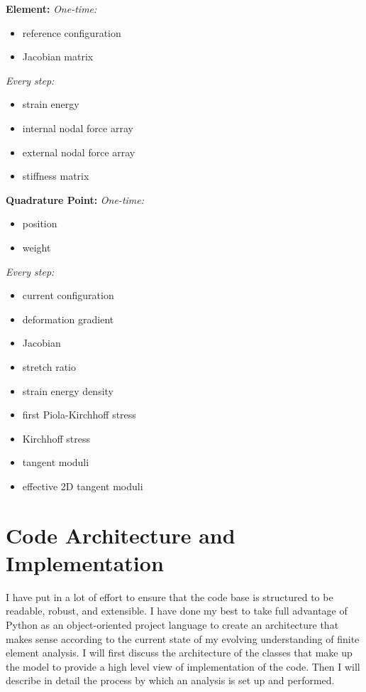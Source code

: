 \documentclass[]{spie}  %
\begin{document}
\noindent
\textbf{Element:} \smallbreak
\indent \textit{One-time:}
\begin{itemize}
	\item reference configuration
	\item Jacobian matrix
\end{itemize}
\smallbreak \textit{Every step:}
\begin{itemize}
	\item strain energy
	\item internal nodal force array
	\item external nodal force array
	\item stiffness matrix
\end{itemize}

\noindent
\textbf{Quadrature Point:} \smallbreak
\textit{One-time:}
\begin{itemize}
	\item position
	\item weight
\end{itemize}
\smallbreak \textit{Every step:}
\begin{itemize}
	\item current configuration
	\item deformation gradient
	\item Jacobian
	\item stretch ratio
	\item strain energy density
	\item first Piola-Kirchhoff stress
	\item Kirchhoff stress
	\item tangent moduli
	\item effective 2D tangent moduli
\end{itemize}


\section{Code Architecture and Implementation}
I have put in a lot of effort to ensure that the code base is structured to be readable, robust, and extensible. I have done my best to take full advantage of Python as an object-oriented project language to create an architecture that makes sense according to the current state of my evolving understanding of finite element analysis. I will first discuss the architecture of the classes that make up the model to provide a high level view of implementation of the code. Then I will describe in detail the process by which an analysis is set up and performed. 
\end{document}
